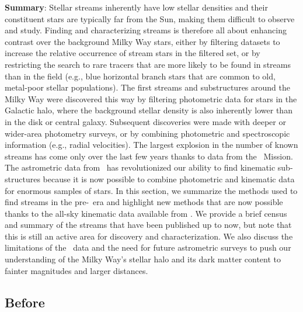 \documentclass[final,5p,times,twocolumn,authoryear]{elsarticle}
\begin{document}
\textbf{Summary}: Stellar streams inherently have low stellar densities and their
constituent stars are typically far from the Sun, making them difficult to observe and
study.
Finding and characterizing streams is therefore all about enhancing contrast over the
background Milky Way stars, either by filtering datasets to increase the relative
occurrence of stream stars in the filtered set, or by restricting the search to rare
tracers that are more likely to be found in streams than in the field (e.g., blue
horizontal branch stars that are common to old, metal-poor stellar populations).
The first streams and substructures around the Milky Way were discovered this way by
filtering photometric data for stars in the Galactic halo, where the background stellar
density is also inherently lower than in the disk or central galaxy.
Subsequent discoveries were made with deeper or wider-area photometry surveys, or by
combining photometric and spectroscopic information (e.g., radial velocities).
The largest explosion in the number of known streams has come only over the last few
years thanks to data from the \gaia\ Mission.
The astrometric data from \gaia\ has revolutionized our ability to find kinematic
sub-structures because it is now possible to combine photometric and kinematic data for
enormous samples of stars.
In this section, we summarize the methods used to find streams in the pre-\gaia\ era and
highlight new methods that are now possible thanks to the all-sky kinematic data
available from \gaia.
We provide a brief census and summary of the streams that have been published up to now,
but note that this is still an active area for discovery and characterization.
We also discuss the limitations of the \gaia\ data and the need for future astrometric
surveys to push our understanding of the Milky Way's stellar halo and its dark matter
content to fainter magnitudes and larger distances.


\subsection{Before \gaia}
\end{document}

